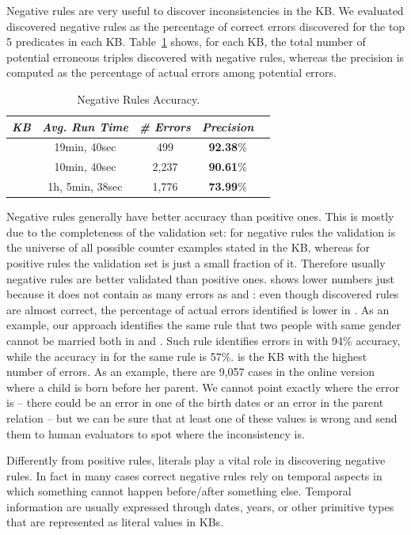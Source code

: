  Negative rules are very useful to discover inconsistencies in the KB. We evaluated discovered negative rules as the percentage of correct errors discovered for the top 5 predicates in each KB. Table~\ref{tab:neg_rules_acc} shows, for each KB, the total number of potential erroneous triples discovered with negative rules, whereas the precision is computed as the percentage of actual errors among potential errors.

\begin{table}[htb]
	\centering
	\caption{Negative Rules Accuracy.}
	\label{tab:neg_rules_acc}
	\begin{tabular}{|c|c|c|c|c|}
		\hline
		\hline
		{\it KB}&{\it Avg. Run Time}&{\it \# Errors} & {\it Precision} \tabularnewline
		\hline
		\dbpedia & 19min, 40sec& 499 & \textbf{92.38}\%\tabularnewline
		\yago & 10min, 40sec & 2,237& \textbf{90.61}\%\tabularnewline
		\wikidata & 1h, 5min, 38sec & 1,776 & \textbf{73.99}\%\tabularnewline
		\hline
	\end{tabular}
\end{table}

Negative rules generally have better accuracy than positive ones. This is mostly due to the completeness of the validation set: for negative rules the validation is the universe of all possible counter examples stated in the KB, whereas for positive rules the validation set is just a small fraction of it. Therefore usually negative rules are better validated than positive ones. \wikidata shows lower numbers just because it does not contain as many errors as \dbpedia and \yago: even though discovered rules are almost correct, the percentage of actual errors identified is lower in \wikidata. As an example, our approach identifies the same rule that two people with same gender cannot be married both in \yago and \wikidata. Such rule identifies errors in \yago with 94\% accuracy, while the accuracy in \wikidata for the same rule is 57\%. \yago is the KB with the highest number of errors. As an example, there are 9,057 cases in the online version where a child is born before her parent. We cannot point exactly where the error is -- there could be an error in one of the birth dates or an error in the parent relation -- but we can be sure that at least one of these values is wrong and send them to human evaluators to spot where the inconsistency is.

Differently from positive rules, literals play a vital role in discovering negative rules. In fact in many cases correct negative rules rely on temporal aspects in which something cannot happen before/after something else. Temporal information are usually expressed through dates, years, or other primitive types that are represented as literal values in KBs.

